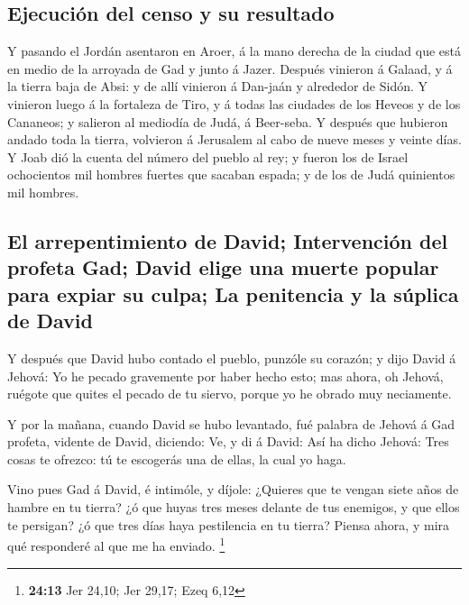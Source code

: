\hypertarget{ejecuciuxf3n-del-censo-y-su-resultado}{%
\subsection{Ejecución del censo y su
resultado}\label{ejecuciuxf3n-del-censo-y-su-resultado}}

 Y pasando el Jordán asentaron en Aroer, á la mano derecha
de la ciudad que está en medio de la arroyada de Gad y junto á Jazer.
 Después vinieron á Galaad, y á la tierra baja de Absi: y de
allí vinieron á Dan-jaán y alrededor de Sidón.  Y vinieron
luego á la fortaleza de Tiro, y á todas las ciudades de los Heveos y de
los Cananeos; y salieron al mediodía de Judá, á Beer-seba. 
Y después que hubieron andado toda la tierra, volvieron á Jerusalem al
cabo de nueve meses y veinte días.  Y Joab dió la cuenta del
número del pueblo al rey; y fueron los de Israel ochocientos mil hombres
fuertes que sacaban espada; y de los de Judá quinientos mil hombres.

\hypertarget{el-arrepentimiento-de-david-intervenciuxf3n-del-profeta-gad-david-elige-una-muerte-popular-para-expiar-su-culpa-la-penitencia-y-la-suxfaplica-de-david}{%
\subsection{El arrepentimiento de David; Intervención del profeta Gad;
David elige una muerte popular para expiar su culpa; La penitencia y la
súplica de
David}\label{el-arrepentimiento-de-david-intervenciuxf3n-del-profeta-gad-david-elige-una-muerte-popular-para-expiar-su-culpa-la-penitencia-y-la-suxfaplica-de-david}}

 Y después que David hubo contado el pueblo, punzóle su
corazón; y dijo David á Jehová: Yo he pecado gravemente por haber hecho
esto; mas ahora, oh Jehová, ruégote que quites el pecado de tu siervo,
porque yo he obrado muy neciamente.

 Y por la mañana, cuando David se hubo levantado, fué
palabra de Jehová á Gad profeta, vidente de David, diciendo:
 Ve, y di á David: Así ha dicho Jehová: Tres cosas te
ofrezco: tú te escogerás una de ellas, la cual yo haga.

 Vino pues Gad á David, é intimóle, y díjole: ¿Quieres que
te vengan siete años de hambre en tu tierra? ¿ó que huyas tres meses
delante de tus enemigos, y que ellos te persigan? ¿ó que tres días haya
pestilencia en tu tierra? Piensa ahora, y mira qué responderé al que me
ha enviado. \footnote{\textbf{24:13} Jer 24,10; Jer 29,17; Ezeq 6,12}

